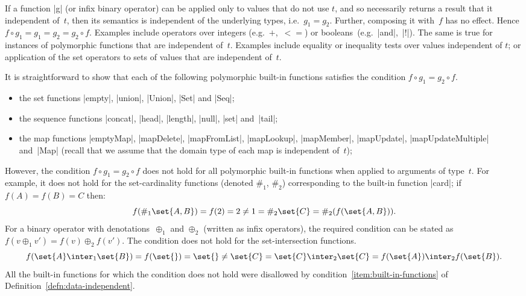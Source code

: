If a function |g| (or infix binary operator) can be applied only to values
that do not use $t$, and so necessarily returns a result that it independent
of~$t$, then its semantics is independent of the underlying types, i.e.~$g_1 =
g_2$.  Further, composing it with~$f$ has no effect.  Hence $f \circ g_1 = g_1
= g_2 = g_2 \circ f$.  Examples include operators over integers
(e.g.~$+$,~$<=$) or booleans~(e.g.~|and|,~|!|).  The same is true for
instances of polymorphic functions that are independent of~$t$.  Examples
include equality or inequality tests over values independent of $t$; or
application of the set operators to sets of values that are independent
of~$t$.

It is straightforward to show that each of the following polymorphic built-in
functions satisfies the condition $f \circ g_1 = g_2 \circ f$.
%
\begin{itemize}
\item the set functions |empty|, |union|, |Union|, |Set| and |Seq|;

\item the sequence functions |concat|,  |head|, |length|, |null|, |set|
and~|tail|; 

\item the map functions |emptyMap|, |mapDelete|, |mapFromList|, |mapLookup|,
  |mapMember|, |mapUpdate|, |mapUpdateMultiple| and~|Map| (recall that we
  assume that the domain type of each map is independent of~$t$);
\end{itemize}

However, the condition $f \circ g_1 = g_2 \circ f$ does not hold for all
polymorphic built-in functions when applied to arguments of type~$t$.  For
example, it does not hold for the set-cardinality functions (denoted $\#_1$,
$\#_2$) corresponding to the built-in function |card|; if $f(A) = f(B) = C$
then:
\[
f(\#_1\set{A,B}) = f(2) = 2 \ne 1 = \#_2\set{C} = \#_2(f(\set{A,B})).
\]
For a binary operator with denotations~$\oplus_1$ and $\oplus_2$ (written as
infix operators), the required condition can be stated as $f(v \oplus_1 v') =
f(v) \oplus_2 f(v')$.  The condition does not hold for the set-intersection
functions.
\[
f(\set{A} \inter_1 \set{B}) = f(\set{}) = \set{} \ne \set{C} 
  = \set{C} \inter_2 \set{C} = f(\set{A}) \inter_2 f(\set{B}).
\]
All the built-in functions for which the condition does not hold were
disallowed by condition~\ref{item:built-in-functions} of
Definition~\ref{defn:data-independent}.


